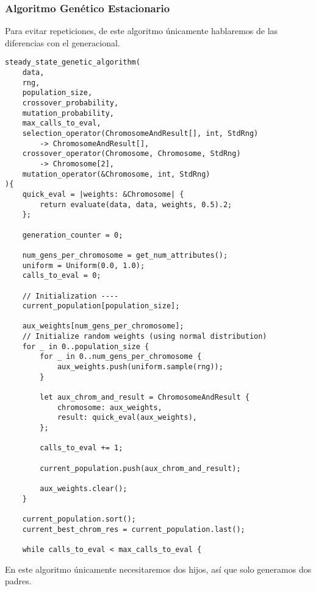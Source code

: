 \documentclass[size=a4, parskip=half, titlepage=false, toc=flat, toc=bib, 12pt]{scrartcl}
\begin{document}
\subsubsection{Algoritmo Genético Estacionario}
Para evitar repeticiones, de este algoritmo únicamente hablaremos de las diferencias con el generacional.
\begin{verbatim}
steady_state_genetic_algorithm(
    data,
    rng,
    population_size,
    crossover_probability,
    mutation_probability,
    max_calls_to_eval,
    selection_operator(ChromosomeAndResult[], int, StdRng)
        -> ChromosomeAndResult[],
    crossover_operator(Chromosome, Chromosome, StdRng)
        -> Chromosome[2],
    mutation_operator(&Chromosome, int, StdRng)
){
    quick_eval = |weights: &Chromosome| {
        return evaluate(data, data, weights, 0.5).2;
    };

    generation_counter = 0;

    num_gens_per_chromosome = get_num_attributes();
    uniform = Uniform(0.0, 1.0);
    calls_to_eval = 0;

    // Initialization ----
    current_population[population_size];

    aux_weights[num_gens_per_chromosome];
    // Initialize random weights (using normal distribution)
    for _ in 0..population_size {
        for _ in 0..num_gens_per_chromosome {
            aux_weights.push(uniform.sample(rng));
        }

        let aux_chrom_and_result = ChromosomeAndResult {
            chromosome: aux_weights,
            result: quick_eval(aux_weights),
        };

        calls_to_eval += 1;

        current_population.push(aux_chrom_and_result);

        aux_weights.clear();
    }

    current_population.sort();
    current_best_chrom_res = current_population.last();

    while calls_to_eval < max_calls_to_eval {
\end{verbatim}
En este algoritmo únicamente necesitaremos dos hijos, así que solo generamos dos padres.
\end{document}
